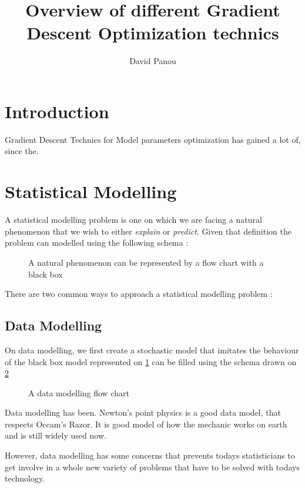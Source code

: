 \documentclass[a4paper,10pt]{article}
\title{Overview of different Gradient Descent Optimization technics}
\author{David Panou}
\begin{document}
\maketitle

\section{Introduction}

Gradient Descent Technics for Model parameters optimization has gained a lot of, since the.
\medskip

\section{Statistical Modelling}
A statistical modelling problem is one on which we are facing a natural phenomenon that we wish to either \emph{explain} or \emph{predict}.
Given that definition the problem can modelled using the following schema : 

\begin{figure}[!h]
  \caption{A natural phenomenon can be represented by a flow chart with a black box}
  \label{Statistical Modelling}
  \centering
\end{figure}

There are two common ways to approach a statistical modelling problem :
\subsection{Data Modelling}
On data modelling, we first create a stochastic model that imitates the behaviour of the black box model represented on \ref{Statistical Modelling} can be filled using the schema drawn on \ref{Data Modelling}

\begin{figure}[!h]
  \caption{A data modelling flow chart}
  \label{Data Modelling}
  \centering
\end{figure}

Data modelling has been. Newton's point physics is a good data model, that respects Occam's Razor. It is good model of how the mechanic works on earth and is still widely used now.

However, data modelling has some concerns that prevents todays statisticians to get involve in a whole new variety of problems that have to be solved with todays technology.
\end{document}
